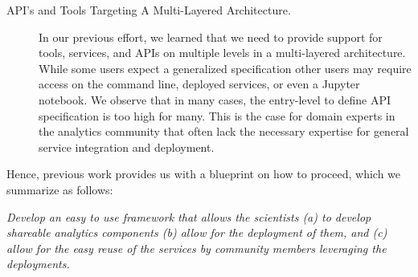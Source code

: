 \begin{description}
\item[API's and Tools Targeting A Multi-Layered Architecture.] In our
  previous effort, we learned that we need to provide support for
  tools, services, and APIs on multiple levels in a multi-layered
  architecture. While some users expect a generalized specification other users may require access on the command line, deployed services, or even a Jupyter notebook. We observe that in many cases,
  the entry-level to define API specification is too high for many. This is the case for domain experts in the analytics community that often lack the necessary expertise for general service integration and deployment.

\end{description}

Hence, previous work provides us with a blueprint on how to proceed, which we summarize as 
follows:

{\em Develop an easy to use framework that allows the scientists (a) to develop shareable analytics components (b) allow for the deployment of them, and (c) allow for the easy reuse of the services by community members leveraging the deployments.} 


